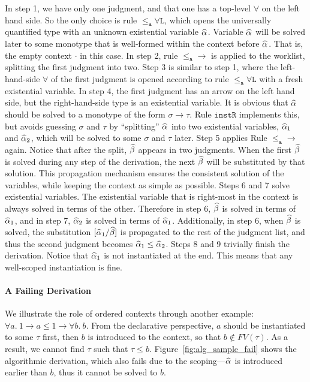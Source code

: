 In step 1, we have only one judgment, and that one has a top-level $\forall$ on
the left hand side. So the only choice is rule $\mathtt{{\le_a}\forall L}$, which
opens the universally quantified type with an unknown existential variable
$\al$. Variable $\al$ will be solved later to some monotype that is well-formed
within the context before $\al$. That is, the empty context $\cdot$ in this
case.
In step 2, rule $\mathtt{{\le_a}{\to}}$ is applied to the worklist,
splitting the first judgment into two.
Step 3 is similar to step 1, where the left-hand-side $\forall$ of the first
judgment is opened according to rule $\mathtt{{\le_a}\forall L}$ with a fresh
existential variable.
In step 4, the first judgment has an arrow on the left hand side, but the
right-hand-side type is an existential variable. It is obvious
that $\al$ should be solved to a monotype of the form
$\sigma \to \tau$. Rule $\mathtt{instR}$ implements this, but avoids
guessing $\sigma$ and $\tau$ by ``splitting'' $\al$ into two existential
variables, $\al[1]$ and $\al[2]$, which will be solved to some $\sigma$ and
$\tau$ later.
Step 5 applies Rule $\mathtt{{\le_a}{\to}}$ again. Notice that after the
split, $\bt$ appears in two judgments. When the first $\bt$ is solved
during any step of the derivation, the next $\bt$ will be substituted by that
solution.  This propagation mechanism ensures the consistent solution of the
variables, while keeping the context as simple as possible.
Steps 6 and 7 solve existential variables. The existential
variable that is right-most in the context is always solved in terms of the other. Therefore in step 6,
$\bt$ is solved in terms of $\al[1]$, and in step 7, $\al[2]$ is solved in terms of $\al[1]$.
Additionally, in step 6, when $\bt$ is solved, the substitution $[\al[1] /
\bt]$ is propagated to the rest of the judgment list, and thus the second
judgment becomes $\al[1]\le\al[2]$.
Steps 8 and 9 trivially finish the derivation. Notice that $\al[1]$ is not
instantiated at the end. This means that any well-scoped instantiation is fine.

\paragraph{A Failing Derivation} We illustrate the role of ordered contexts through another example: $\forall a.\ 1\to a \le 1\to \forall b.\ b$. From the declarative perspective, $a$ should be instantiated to some $\tau$ first, then $b$ is introduced to the context, so that $b\notin FV(\tau)$. As a result, we cannot find $\tau$ such that $\tau \le b$. Figure~\ref{fig:alg_sample_fail} shows the algorithmic derivation, which also fails due to the scoping---$\al$ is introduced earlier than $b$, thus it cannot be solved to $b$.





